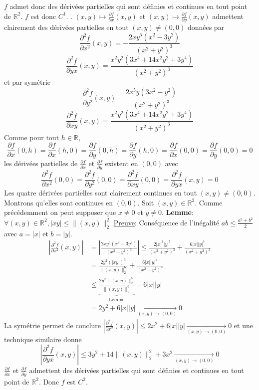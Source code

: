 \documentclass{report}
\begin{document}
$f$ admet donc des dérivées partielles qui sont définies et continues en tout point de $\mathbb R^2$. $f$ est donc $C^1$. \newline
{}. $(x,y)\mapsto \frac{\partial f}{\partial x}(x,y)$ et $(x,y)\mapsto \frac{\partial f}{\partial y}(x,y)$ admettent clairement des dérivées partielles en tout $(x,y)\neq (0,0)$ données par $$\frac{\partial^2 f}{\partial x^2}(x,y)=-\frac{2 x y^5 \left(x^2-3 y^2\right)}{\left(x^2+y^2\right)^3}$$ $$\frac{\partial^2 f}{\partial yx}(x,y)=\frac{x^2 y^2 \left(3 x^4+14 x^2 y^2+3 y^4\right)}{\left(x^2+y^2\right)^3}$$ et par symétrie $$\frac{\partial^2 f}{\partial y^2}(x,y)=\frac{2 x^5 y \left(3 x^2-y^2\right)}{\left(x^2+y^2\right)^3}$$ $$\frac{\partial^2 f}{\partial xy}(x,y)=\frac{x^2 y^2 \left(3 x^4+14 x^2 y^2+3 y^4\right)}{\left(x^2+y^2\right)^3}$$
Comme pour tout $h\in \mathbb R$, $$\frac{\partial f}{\partial x}(0,h)=\frac{\partial f}{\partial x}(h,0)=\frac{\partial f}{\partial y}(0,h)=\frac{\partial f}{\partial y}(h,0)=\frac{\partial f}{\partial x}(0,0)=\frac{\partial f}{\partial y}(0,0)=0$$ les dérivées partielles de $\frac{\partial f}{\partial x}$ et  $\frac{\partial f}{\partial y}$ existent en $(0,0)$ avec $$\frac{\partial^2 f}{\partial x^2}(0,0)=\frac{\partial^2 f}{\partial y^2}(0,0)=\frac{\partial^2 f}{\partial xy}(0,0)=\frac{\partial^2 f}{\partial yx}(x,y)=0$$
\newline 
Les quatre dérivées partielles sont clairement continues en tout $(x,y)\neq (0,0)$. Montrons qu'elles sont continues en $(0,0)$. \newline
Soit $(x,y)\in \mathbb R^2$. Comme précédemment on peut supposer que $x\neq 0$ et $y\neq 0$.\newline
\newline
\textbf{Lemme}: $\forall (x,y)\in \mathbb R^2, |xy| \leq \|(x,y)\|_2^2$\newline
\underline{Preuve}: Conséquence de l'inégalité $ab\leq \frac{a^2+b^2}{2}$ avec $a=|x|$ et $b=|y|$.\newline
\newline
$$\begin{aligned}\left|\frac{\partial^2 f}{\partial x^2}(x,y)\right|&=\left|\frac{2 x y^5 \left(x^2-3 y^2\right)}{\left(x^2+y^2\right)^3}\right|\leq \frac{2|x|^3|y|^5}{(x^2+y^2)^3}+\frac{6|x||y|^7}{(x^2+y^2)^3}\\
&= \frac{2y^2 (|xy|)^3}{\|(x,y)\|_2^6} + \frac{6|x||y|^7}{(x^2+y^2)^3}\\
&{\leq} \underbrace{\frac{2y^2\|(x,y)\|_2^6}{\|(x,y)\|_2^6}}_{\text{Lemme}} + 6|x||y|\\
&=2y^2+ 6|x||y| \xrightarrow[(x,y)\to (0,0)]{}0
\end{aligned}$$
La symétrie permet de conclure $\left|\frac{\partial^2 f}{\partial x^2}(x,y)\right|\leq 2x^2+ 6|x||y| \xrightarrow[(x,y)\to (0,0)]{}0$ \newline et une technique similaire donne $$\left|\frac{\partial^2 f}{\partial yx}(x,y)\right|\leq 3y^2+ 14\|(x,y)\|_2^2+3x^2 \xrightarrow[(x,y)\to (0,0)]{}0$$
$\frac{\partial f}{\partial x}$ et $\frac{\partial f}{\partial y}$ admettent des dérivées partielles qui sont définies et continues en tout point de $\mathbb R^2$. Donc $f$ est $C^2$.
\end{document}
